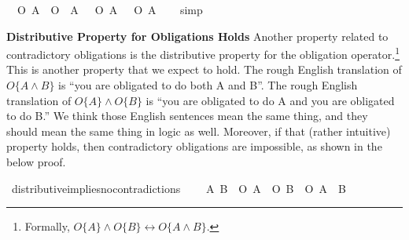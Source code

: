 \begin{isabellebody}
\begin{isamarkuptext}
\medskip%
\end{isamarkuptext}\isamarkuptrue%
\isamarkupfalse%
\ {\isachardoublequoteopen}{\isasymTurnstile}\ {\isacharparenleft}{\isacharparenleft}O\ {\isacharbraceleft}A{\isacharbraceright}\ \isactrlbold {\isasymand}\ O\ {\isacharbraceleft}\isactrlbold {\isasymnot}\ A{\isacharbraceright}{\isacharparenright}\ \isactrlbold {\isasymequiv}\ {\isacharparenleft}\isactrlbold {\isasymnot}\ {\isacharparenleft}O\ {\isacharbraceleft}A{\isacharbraceright}\ \isactrlbold {\isasymrightarrow}\ \isactrlbold {\isasymnot}\ O\ {\isacharbraceleft}\isactrlbold {\isasymnot}A{\isacharbraceright}{\isacharparenright}{\isacharparenright}{\isacharparenright}{\isachardoublequoteclose}\isanewline
%
\isadelimproof
\ \ %
\endisadelimproof
%
\isatagproof
{}\isamarkupfalse%
\ simp\isanewline
%
%
\endisatagproof
{\isafoldproof}%
%
\isadelimproof
%
\endisadelimproof
%
\begin{isamarkuptext}%
\noindent \textbf{Distributive Property for Obligations Holds} Another property related to contradictory obligations is the distributive property for the obligation
operator.\footnote{Formally, $O\{A\} \wedge O\{B\} \longleftrightarrow O\{A \wedge B\}$.} This is 
another property that we expect to hold. The rough English translation of  $O \{ A \wedge B \} $ is ``you are obligated to 
do both A and B''. The rough English translation of $O\{A\} \wedge O\{B\}$ is ``you are obligated to do A 
and you are obligated to do B.'' We think those English sentences mean the same thing, and they should mean 
the same thing in logic as well. Moreover, if that (rather intuitive) property holds, then contradictory
obligations are impossible, as shown in the below proof.%
\end{isamarkuptext}\isamarkuptrue%
\isamarkupfalse%
\ distributive{\isacharunderscore}implies{\isacharunderscore}no{\isacharunderscore}contradictions{\isacharcolon}\ \isanewline
\ \ \ {\isachardoublequoteopen}{\isasymforall}A\ B{\isachardot}\ {\isasymTurnstile}\ {\isacharparenleft}{\isacharparenleft}O\ {\isacharbraceleft}A{\isacharbraceright}\ \isactrlbold {\isasymand}\ O\ {\isacharbraceleft}B{\isacharbraceright}{\isacharparenright}\ \isactrlbold {\isasymequiv}\ O\ {\isacharbraceleft}A\ \isactrlbold {\isasymand}\ B{\isacharbraceright}{\isacharparenright}{\isachardoublequoteclose}\isanewline

\end{isabellebody}
